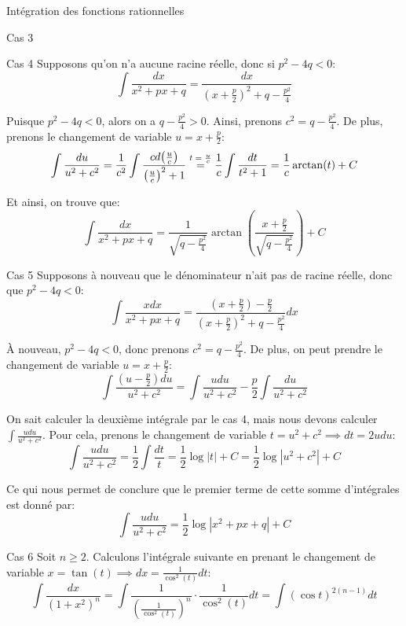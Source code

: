 \documentclass[a4paper]{article}
\begin{document}
\begin{parag}{Intégration des fonctions rationnelles}
\begin{subparag}{Cas 3}
        \[\]
    \end{subparag}

    \begin{subparag}{Cas 4}
        Supposons qu'on n'a aucune racine réelle, donc si $p^2 - 4q < 0$:
        \[\int \frac{dx}{x^2 + px + q} = \frac{dx}{\left(x + \frac{p}{2}\right)^2 + q - \frac{p^2}{4}}\]

        Puisque $p^2 - 4q < 0$, alors on a $q - \frac{p^2}{4} > 0$. Ainsi, prenons $c^2= q - \frac{p^2}{4}$. De plus, prenons le changement de variable $u = x + \frac{p}{2}$:
        \[\int \frac{du}{u^2 + c^2} = \frac{1}{c^2} \int \frac{c d\left(\frac{u}{c}\right)}{\left(\frac{u}{c}\right)^2 + 1} \over{=}{$t = \frac{u}{c}$} \frac{1}{c} \int \frac{dt}{t^2 + 1} = \frac{1}{c} \arctan\left(t\right) + C\]

        Et ainsi, on trouve que:
        \[\int \frac{dx}{x^2 + px + q} = \frac{1}{\sqrt{q - \frac{p^2}{4}}} \arctan\left(\frac{x + \frac{p}{2}}{\sqrt{q - \frac{p^2}{4}}}\right) + C\]
    \end{subparag}

    \begin{subparag}{Cas 5}
        Supposons à nouveau que le dénominateur n'ait pas de racine réelle, donc que $p^2 - 4q < 0$:
        \[\int \frac{xdx}{x^2+ px + q} = \frac{\left(x + \frac{p}{2}\right) - \frac{p}{2}}{\left(x + \frac{p}{2}\right)^2 + q - \frac{p^2}{4}}dx\]

        À nouveau, $p^2 - 4q < 0$, donc prenons $c^2 = q - \frac{p^2}{4}$. De plus, on peut prendre le changement de variable $u = x + \frac{p}{2}$:
        \[\int \frac{\left(u - \frac{p}{2}\right)du}{u^2 + c^2} = \int \frac{udu}{u^2 + c^2} - \frac{p}{2} \int \frac{du}{u^2 + c^2}\]

        On sait calculer la deuxième intégrale par le cas 4, mais nous devons calculer $\int \frac{udu}{u^2 + c^2}$. Pour cela, prenons le changement de variable $t= u^2 + c^2\implies dt = 2udu$:
        \[\int \frac{udu}{u^2 + c^2} = \frac{1}{2} \int \frac{dt}{t} = \frac{1}{2} \log\left|t\right| + C = \frac{1}{2} \log\left|u^2 + c^2\right| + C\]

        Ce qui nous permet de conclure que le premier terme de cette somme d'intégrales est donné par: 
        \[\int \frac{udu}{u^2 + c^2} = \frac{1}{2} \log\left|x^2 + px + q\right| + C\]
    \end{subparag}

    \begin{subparag}{Cas 6}
        Soit $n \geq 2$. Calculons l'intégrale suivante en prenant le changement de variable $x = \tan\left(t\right) \implies dx = \frac{1}{\cos^2\left(t\right)}dt$: 
        \[\int \frac{dx}{\left(1 + x^2\right)^n} = \int \frac{1}{\left(\frac{1}{\cos^2\left(t\right)}\right)^n} \cdot \frac{1}{\cos^2\left(t\right)} dt = \int \left(\cos t\right)^{2\left(n - 1\right)}dt\]


\end{subparag}
\end{parag}
\end{document}
